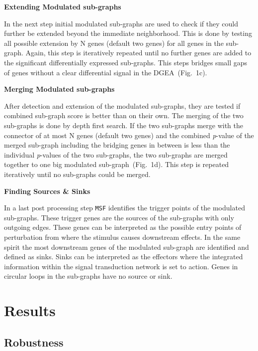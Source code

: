 \documentclass[twocolumn]{article}
\begin{document}
\textbf{Extending Modulated sub-graphs}

In the next step initial modulated sub-graphs are used to check if
they could further be extended beyond the immediate neighborhood.
This is done by testing all possible extension by N genes (default two genes) for
all genes in the sub-graph. Again, this step is iteratively repeated until no
further genes are added to the significant differentially expressed
sub-graphs. This steps bridges small gaps of genes without a clear
differential signal in the DGEA~(Fig.~1c).\newline

\textbf{Merging Modulated sub-graphs}

After detection and extension of the modulated sub-graphs, they are
tested if combined sub-graph score is better than on their own. The merging of the two sub-graphs is done by depth first search. If the two sub-graphs merge with the connector of at most N genes (default two genes) and the
combined \textit{p}-value of the merged sub-graph including the
bridging genes in between is less than the individual
\textit{p}-values of the two sub-graphs, the two sub-graphs are merged
together to one big modulated sub-graph~(Fig.~1d). This step is repeated iteratively until no sub-graphs could be merged.\newline
 
\textbf{Finding Sources \& Sinks}

In a last post processing step \texttt{MSF} identifies the trigger
points of the modulated sub-graphs. These trigger genes are the sources
of the sub-graphs with only outgoing edges. These genes can be
interpreted as the possible entry points of perturbation from where the
stimulus causes downstream effects. In the same spirit the most
downstream genes of the modulated sub-graph are identified and defined
as sinks. Sinks can be interpreted as the effectors where the
integrated information within the signal transduction network is set
to action. Genes in circular loops in the sub-graphs have no source or sink.


\section*{Results}

\subsection*{Robustness}
\end{document}
